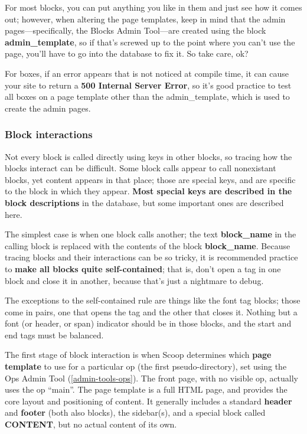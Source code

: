 For most blocks, you can put anything you like in them and just see how it comes out; however, when altering the page templates, keep in mind that the admin pages---specifically, the Blocks Admin Tool---are created using the block {\bf admin\_template}, so if that's screwed up to the point where you can't use the page, you'll have to go into the database to fix it.  So take care, ok?

For boxes, if an error appears that is not noticed at compile time, it can cause your site to return a {\bf 500 Internal Server Error}, so it's good practice to test all boxes on a page template other than the admin\_template, which is used to create the admin pages.

\subsubsection{Block interactions}
\label{blocks-interactions}

Not every block is called directly using keys in other blocks, so tracing how the blocks interact can be difficult.  Some block calls appear to call nonexistant blocks, yet content appears in that place; those are special keys, and are specific to the block in which they appear.  {\bf Most special keys are described in the block descriptions} in the database, but some important ones are described here.

The simplest case is when one block calls another; the text {\bf \latexhtml{$\vert$}{|}block\_name\latexhtml{$\vert$}{|}} in the calling block is replaced with the contents of the block {\bf block\_name}.  Because tracing blocks and their interactions can be so tricky, it is recommended practice to {\bf make all blocks quite self-contained}; that is, don't open a tag in one block and close it in another, because that's just a nightmare to debug. 

The exceptions to the self-contained rule are things like the font tag blocks; those come in pairs, one that opens the tag and the other that closes it. Nothing but a font (or header, or span) indicator should be in those blocks, and the start and end tags must be balanced.

The first stage of block interaction is when Scoop determines which {\bf page template} to use for a particular op (the first pseudo-directory), set using the Ops Admin Tool (\ref{admin-tools-ops}).  The front page, with no visible op, actually uses the op ``main''.  The page template is a full HTML page, and provides the core layout and positioning of content.  It generally includes a standard {\bf header} and {\bf footer} (both also blocks), the sidebar(s), and a special block called {\bf CONTENT}, but no actual content of its own.

